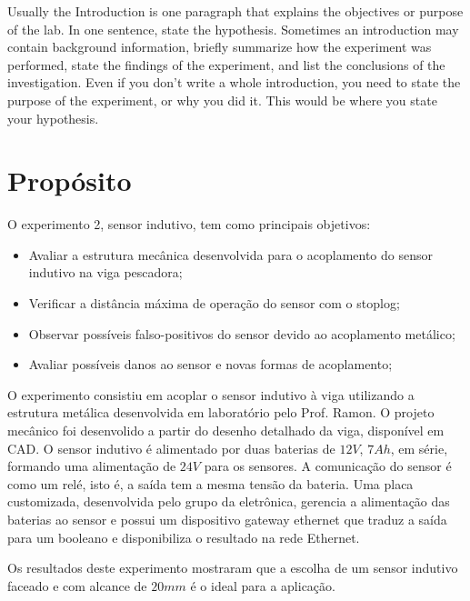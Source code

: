 
 
Usually the Introduction is one paragraph that explains the objectives or purpose of the lab. In one sentence, state the hypothesis. Sometimes an introduction may contain background information, briefly summarize how the experiment was performed, state the findings of the experiment, and list the conclusions of the investigation. Even if you don't write a whole introduction, you need to state the purpose of the experiment, or why you did it. This would be where you state your hypothesis.

\section{Propósito}
O experimento 2, sensor indutivo, tem como principais objetivos:
 \begin{itemize}
 \item Avaliar a estrutura mecânica desenvolvida para o acoplamento do sensor
 indutivo na viga pescadora;
 \item Verificar a distância máxima de operação do sensor com o stoplog;
 \item Observar possíveis falso-positivos do sensor devido ao acoplamento
 metálico;
 \item Avaliar possíveis danos ao sensor e novas formas de acoplamento;
 \end{itemize}
\label{proposito}
O experimento consistiu em acoplar o sensor indutivo à viga utilizando a
estrutura metálica desenvolvida em laboratório pelo Prof. Ramon. O projeto
mecânico foi desenvolido a partir do desenho detalhado da viga,
disponível em CAD.
O sensor indutivo é alimentado por duas baterias de $12V$, $7Ah$, em série, formando uma alimentação de $24V$ para
os sensores. A comunicação do sensor é como um relé, isto é, a saída tem a mesma
tensão da bateria. Uma placa customizada, desenvolvida pelo grupo da eletrônica,
gerencia a alimentação das baterias ao sensor e possui um
dispositivo gateway ethernet que traduz a saída para um booleano e
disponibiliza o resultado na rede Ethernet.

Os resultados deste experimento mostraram que a escolha de um sensor indutivo
faceado e com alcance de $20mm$ é o ideal para a aplicação.
